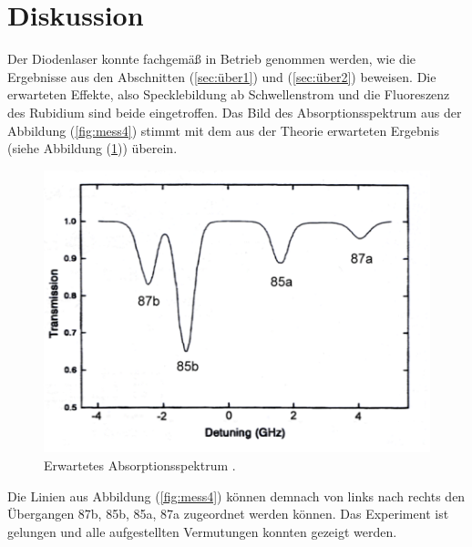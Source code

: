 \newpage
\section{Diskussion}
\label{sec:Diskussion}
Der Diodenlaser konnte fachgemäß in Betrieb genommen werden, wie die Ergebnisse aus den Abschnitten (\ref{sec:über1}) und (\ref{sec:über2}) beweisen. Die erwarteten Effekte, also Specklebildung ab
Schwellenstrom und die Fluoreszenz des Rubidium sind beide eingetroffen.
Das Bild des Absorptionsspektrum aus der Abbildung (\ref{fig:mess4}) stimmt mit dem aus der Theorie erwarteten Ergebnis (siehe Abbildung (\ref{fig:absot})) überein.
\begin{figure}[h!]
  \centering
  \includegraphics[scale=0.7]{fig/absot.png}
  \caption{Erwartetes Absorptionsspektrum \cite[13]{Anleitung4}.}
  \label{fig:absot}
\end{figure}
\FloatBarrier
\noindent Die Linien aus Abbildung (\ref{fig:mess4}) können demnach von links nach rechts den Übergangen 87b, 85b, 85a, 87a zugeordnet werden können.
Das Experiment ist gelungen und alle aufgestellten Vermutungen konnten gezeigt werden.
